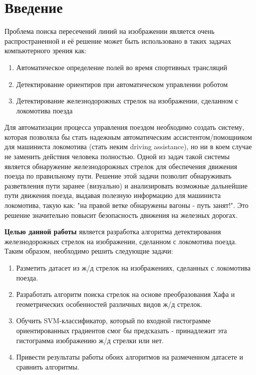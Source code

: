 \chapter{Введение}
\justify
Проблема поиска пересечений линий на изображении является очень распространенной и её решение может быть использовано в таких задачах компьютерного зрения как:
\begin{enumerate}
	\item Автоматическое определение полей во время спортивных трансляций
	\item Детектирование ориентиров при автоматическом управлении роботом
	\item Детектирование железнодорожных стрелок на изображении, сделанном с локомотива поезда
\end{enumerate} 

Для автоматизации процесса управления поездом необходимо создать систему, которая позволяла бы стать надежным автоматическим ассистентом/помощником для машиниста локомотива (стать неким driving assistance), но ни в коем случае не заменить действия человека полностью. 
Одной из задач такой системы является обнаружение железнодорожных стрелок для обеспечения движения поезда по правильному пути.
Решение этой задачи позволит обнаруживать разветвления пути заранее (визуально) и анализировать возможные дальнейшие пути движения поезда, выдавая полезную информацию для машиниста локомотива, такую как: "на правой ветке обнаружены вагоны - путь занят!". Это решение значительно повысит безопасность движения на железных дорогах.

\textbf{Целью данной работы} является разработка алгоритма детектирования железнодорожных стрелок на изображении, сделанном с локомотива поезда. Таким образом, необходимо решить следующие задачи:
\begin{enumerate}
	\item Разметить датасет из ж/д стрелок на изображениях, сделанных с локомотива поезда.
	\item Разработать алгоритм поиска стрелок на основе преобразования Хафа\cite{b:hough_transform} и геометрических особенностей различных видов ж/д стрелок.
	\item Обучить SVM\cite{b:SVM}-классификатор, который по входной гистограмме ориентированных градиентов\cite{b:HOG} смог бы предсказать - принадлежит эта гистограмма изображению ж/д стрелки или нет.
	\item Привести результаты работы обоих алгоритмов на размеченном датасете и сравнить алгоритмы.
\end{enumerate}


